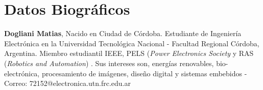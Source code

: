 \section*{Datos Biográficos}

\small{ \textbf{Dogliani Matias}, Nacido en Ciudad de  Córdoba. Estudiante de Ingeniería Electrónica en la Universidad Tecnológica Nacional - Facultad Regional Córdoba, Argentina. Miembro estudiantil IEEE, PELS (\textit{Power Electronics Society} y RAS (\textit{Robotics and Automation}) . Sus intereses son, energías renovables, bio-electrónica, procesamiento de imágenes, diseño digital y sistemas embebidos - Correo: 72152@electronica.utn.frc.edu.ar}



